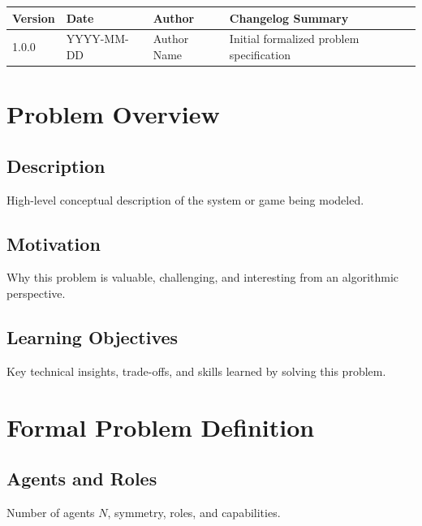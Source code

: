 \documentclass[11pt,a4paper]{article}
\begin{document}
\begin{center}
\begin{tabularx}{\textwidth}{llXX}
\toprule
\textbf{Version} & \textbf{Date} & \textbf{Author} & \textbf{Changelog Summary} \\
\midrule
1.0.0 & YYYY-MM-DD & Author Name & Initial formalized problem specification \\
\bottomrule
\end{tabularx}
\end{center}


\section{Problem Overview}

\subsection{Description}
High-level conceptual description of the system or game being modeled.

\subsection{Motivation}
Why this problem is valuable, challenging, and interesting from an algorithmic perspective.

\subsection{Learning Objectives}
Key technical insights, trade-offs, and skills learned by solving this problem.


\section{Formal Problem Definition}

\subsection{Agents and Roles}
Number of agents $N$, symmetry, roles, and capabilities.
\end{document}
